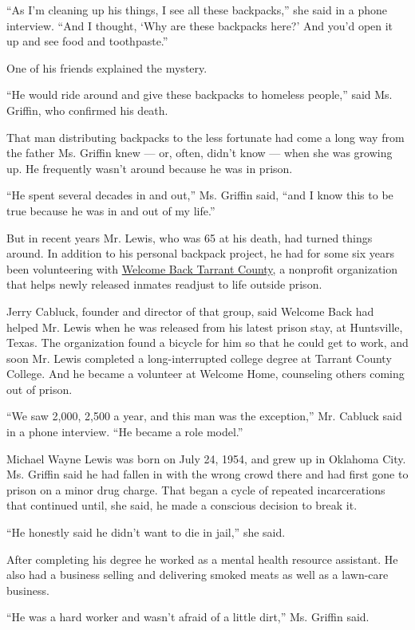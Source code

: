 ``As I'm cleaning up his things, I see all these backpacks,'' she said
in a phone interview. ``And I thought, `Why are these backpacks here?'
And you'd open it up and see food and toothpaste.''

One of his friends explained the mystery.

``He would ride around and give these backpacks to homeless people,''
said Ms. Griffin, who confirmed his death.

That man distributing backpacks to the less fortunate had come a long
way from the father Ms. Griffin knew --- or, often, didn't know --- when
she was growing up. He frequently wasn't around because he was in
prison.

``He spent several decades in and out,'' Ms. Griffin said, ``and I know
this to be true because he was in and out of my life.''

But in recent years Mr. Lewis, who was 65 at his death, had turned
things around. In addition to his personal backpack project, he had for
some six years been volunteering with
\href{https://www.facebook.com/WelcomeBackTC/}{Welcome Back Tarrant
County}, a nonprofit organization that helps newly released inmates
readjust to life outside prison.

Jerry Cabluck, founder and director of that group, said Welcome Back had
helped Mr. Lewis when he was released from his latest prison stay, at
Huntsville, Texas. The organization found a bicycle for him so that he
could get to work, and soon Mr. Lewis completed a long-interrupted
college degree at Tarrant County College. And he became a volunteer at
Welcome Home, counseling others coming out of prison.

``We saw 2,000, 2,500 a year, and this man was the exception,'' Mr.
Cabluck said in a phone interview. ``He became a role model.''

Michael Wayne Lewis was born on July 24, 1954, and grew up in Oklahoma
City. Ms. Griffin said he had fallen in with the wrong crowd there and
had first gone to prison on a minor drug charge. That began a cycle of
repeated incarcerations that continued until, she said, he made a
conscious decision to break it.

``He honestly said he didn't want to die in jail,'' she said.

After completing his degree he worked as a mental health resource
assistant. He also had a business selling and delivering smoked meats as
well as a lawn-care business.

``He was a hard worker and wasn't afraid of a little dirt,'' Ms. Griffin
said.

